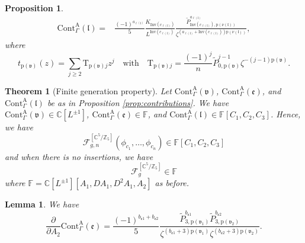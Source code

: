 \documentclass[10pt,a4paper]{amsart}
\newtheorem{lem}{Lemma}
\newtheorem{prop}{Proposition}
\newtheorem{thm}{Theorem}
\begin{document}
\begin{prop}
\begin{equation*}
\begin{aligned}
    \mathrm{Cont}_{\Gamma}^{\mathrm{A}}(\mathfrak{l})
    =&\frac{(-1)^{a_{\ell(\mathfrak{l})}}}{5}\frac{K_{\mathrm{Inv}(c_{\ell(\mathfrak{l})})}}{L^{\mathrm{Inv}(c_{\ell(\mathfrak{l})})}}
    \frac{\widetilde{P}_{\mathrm{Inv}(c_{\ell(\mathfrak{l})}),\mathrm{p}(\nu(\mathfrak{l}))}^{{a_{\ell(\mathfrak{l})}}}}{     \zeta^{({a_{\ell(\mathfrak{l})}}+{\mathrm{Inv}(c_{\ell(\mathfrak{l})})})\mathrm{p}(\nu(\mathfrak{l}))}},
\end{aligned}
\end{equation*}
where
\begin{equation*}
t_{\mathrm{p}(\mathfrak{v})}(z)=\sum_{j\geq{2}}\mathrm{T}_{\mathrm{p}(\mathfrak{v})j}z^j\quad\text{with}\quad \mathrm{T}_{\mathrm{p}(\mathfrak{v})j}=\frac{(-1)^j}{n}\widetilde{P}_{0,\mathrm{p}(\mathfrak{v})}^{j-1}\zeta^{-(j-1)\mathrm{p}(\mathfrak{v})}.
\end{equation*}
\end{prop}

\begin{thm}[Finite generation property]\label{thm:vertex_edge_leg_Rings}
Let $\mathrm{Cont}_{\Gamma}^{\mathrm{A}}(\mathfrak{v})$, $\mathrm{Cont}_{\Gamma}^{\mathrm{A}}(\mathfrak{e})$, and $\mathrm{Cont}_{\Gamma}^{\mathrm{A}}(\mathfrak{l})$ be as in Proposition \ref{prop:contributions}. We have $\mathrm{Cont}_{\Gamma}^{\mathrm{A}}(\mathfrak{v})\in\mathbb{C}[L^{\pm 1}]$, $\mathrm{Cont}_{\Gamma}^{\mathrm{A}}(\mathfrak{e})\in\mathbb{F}$, and $\mathrm{Cont}_{\Gamma}^{\mathrm{A}}(\mathfrak{l})\in\mathbb{F}[C_1,C_2,C_3]$. Hence, we have
\begin{equation*}
\mathcal{F}_{g, n}^{\left[\mathbb{C}^{5} / \mathbb{Z}_{5}\right]}\left(\phi_{c_{1}}, \ldots, \phi_{c_{n}}\right)\in\mathbb{F}[C_1,C_2,C_3]
\end{equation*}
and when there is no insertions, we have
\begin{equation*}
\mathcal{F}_{g}^{\left[\mathbb{C}^{5} / \mathbb{Z}_{5}\right]}\in\mathbb{F}
\end{equation*}
where $\mathbb{F}=\mathbb{C}[L^{\pm 1}][A_1,DA_1,D^2A_1,A_2]$ as before.
\end{thm}

\begin{lem}\label{lem:A2_derivative_of_edge}
We have
\begin{equation*} 
    \frac{\partial}{\partial A_{2}}\mathrm{Cont}_{\Gamma}^{\mathrm{A}}(\mathfrak{e})
    =\frac{(-1)^{b_{\mathfrak{e}1}+b_{\mathfrak{e}2}}}{5} \frac{\widetilde{P}_{3,\mathrm{p}(\mathfrak{v}_1)}^{b_{\mathfrak{e}1}}\widetilde{P}_{3,\mathrm{p}(\mathfrak{v}_2)}^{b_{\mathfrak{e}2}}}{\zeta^{(b_{\mathfrak{e}1}+3)\mathrm{p}(\mathfrak{v}_1)}\zeta^{(b_{\mathfrak{e}2}+3)\mathrm{p}(\mathfrak{v}_2)}}.
\end{equation*}
\end{lem}
\end{document}
